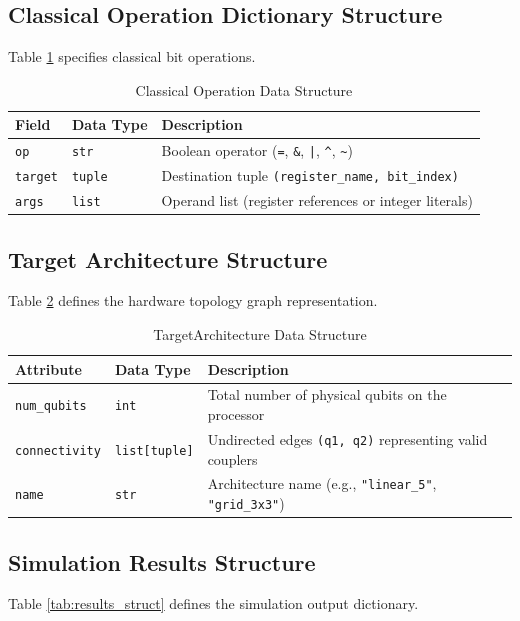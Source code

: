 \subsection{Classical Operation Dictionary Structure}
Table \ref{tab:classic_struct} specifies classical bit operations.

\begin{table}[H]
\centering
\caption{Classical Operation Data Structure}
\label{tab:classic_struct}
\begin{tabular}{|p{3cm}|p{2.5cm}|p{8cm}|}
\hline
\textbf{Field} & \textbf{Data Type} & \textbf{Description} \\
\hline
\texttt{op} & \texttt{str} & Boolean operator (\texttt{=}, \texttt{\&}, \texttt{|}, \texttt{\^{}}, \texttt{\~{}}) \\
\hline
\texttt{target} & \texttt{tuple} & Destination tuple \texttt{(register\_name, bit\_index)} \\
\hline
\texttt{args} & \texttt{list} & Operand list (register references or integer literals) \\
\hline
\end{tabular}
\end{table}

\subsection{Target Architecture Structure}
Table \ref{tab:arch_struct} defines the hardware topology graph representation.

\begin{table}[H]
\centering
\caption{TargetArchitecture Data Structure}
\label{tab:arch_struct}
\begin{tabular}{|p{3cm}|p{2.5cm}|p{8cm}|}
\hline
\textbf{Attribute} & \textbf{Data Type} & \textbf{Description} \\
\hline
\texttt{num\_qubits} & \texttt{int} & Total number of physical qubits on the processor \\
\hline
\texttt{connectivity} & \texttt{list[tuple]} & Undirected edges \texttt{(q1, q2)} representing valid couplers \\
\hline
\texttt{name} & \texttt{str} & Architecture name (e.g., \texttt{"linear\_5"}, \texttt{"grid\_3x3"}) \\
\hline
\end{tabular}
\end{table}

\subsection{Simulation Results Structure}
Table \ref{tab:results_struct} defines the simulation output dictionary.

